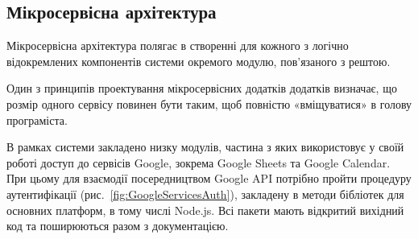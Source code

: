 \subsection{Мікросервісна архітектура}

Мікросервісна архітектура полягає в створенні для кожного з логічно відокремлених компонентів системи окремого модулю, пов'язаного з рештою.

Один з принципів проектування мікросервісних додатків додатків визначає, що розмір одного сервісу повинен бути таким, щоб повністю «вміщуватися» в голову програміста.


В рамках системи закладено низку модулів, частина з яких використовує у своїй роботі доступ до сервісів Google, зокрема Google Sheets та Google Calendar. При цьому для взаємодії посередництвом Google API потрібно пройти процедуру аутентифікації (рис.~\ref{fig:GoogleServicesAuth}), закладену в методи бібліотек для основних платформ, в тому числі Node.js. Всі пакети мають відкритий вихідний код та поширюються разом з документацією.
